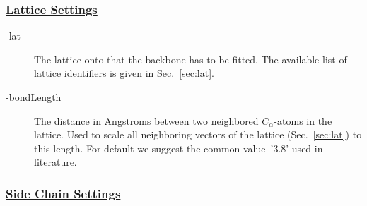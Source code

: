\documentclass{article}
\newcommand{\CA}{$C_\alpha$}
\begin{document}
\subsubsection*{\underline{ Lattice Settings }}

\begin{description}
	\item[-lat] The lattice onto that the backbone has to be fitted. The
	available list of lattice identifiers is given in Sec.~\ref{sec:lat}.
	\item[-bondLength] The distance in Angstroms between two neighbored
	\CA-atoms in the lattice. Used to scale all neighboring vectors of the
	lattice (Sec.~\ref{sec:lat}) to this length. For default we suggest the common
	value~'3.8' used in literature.
\end{description}


\subsubsection*{\underline{ Side Chain Settings }}
\end{document}
